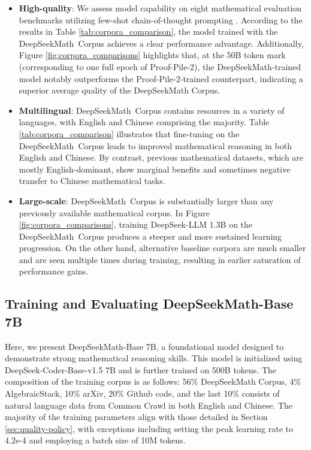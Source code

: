 \begin{itemize}[topsep=0pt]
    \item \textbf{High-quality}:
    We assess model capability on eight mathematical evaluation benchmarks utilizing few-shot chain-of-thought prompting \cite{cot}. According to the results in Table \ref{tab:corpora_comparison}, the model trained with the DeepSeekMath~Corpus achieves a clear performance advantage. Additionally, Figure \ref{fig:corpora_comparisons} highlights that, at the 50B token mark (corresponding to one full epoch of Proof-Pile-2), the DeepSeekMath-trained model notably outperforms the Proof-Pile-2-trained counterpart, indicating a superior average quality of the DeepSeekMath Corpus.
    \item \textbf{Multilingual}:
    DeepSeekMath~Corpus contains resources in a variety of languages, with English and Chinese comprising the majority. Table \ref{tab:corpora_comparison} illustrates that fine-tuning on the DeepSeekMath~Corpus leads to improved mathematical reasoning in both English and Chinese. By contrast, previous mathematical datasets, which are mostly English-dominant, show marginal benefits and sometimes negative transfer to Chinese mathematical tasks.
    \item \textbf{Large-scale}:
    DeepSeekMath~Corpus is substantially larger than any previously available mathematical corpus. In Figure \ref{fig:corpora_comparisons}, training DeepSeek-LLM 1.3B on the DeepSeekMath~Corpus produces a steeper and more sustained learning progression. On the other hand, alternative baseline corpora are much smaller and are seen multiple times during training, resulting in earlier saturation of performance gains.
\end{itemize}

\subsection{Training and Evaluating DeepSeekMath-Base 7B}

Here, we present DeepSeekMath-Base 7B, a foundational model designed to demonstrate strong mathematical reasoning skills. This model is initialized using DeepSeek-Coder-Base-v1.5 7B \citep{deepseek-coder} and is further trained on 500B tokens. The composition of the training corpus is as follows: 56\% DeepSeekMath Corpus, 4\% AlgebraicStack, 10\% arXiv, 20\% Github code, and the last 10\% consists of natural language data from Common Crawl in both English and Chinese. The majority of the training parameters align with those detailed in Section \ref{sec:quality-policy}, with exceptions including setting the peak learning rate to 4.2e-4 and employing a batch size of 10M tokens.

